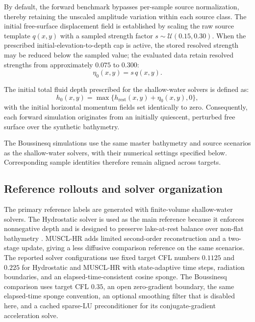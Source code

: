 By default, the forward benchmark bypasses per-sample source normalization, thereby retaining the unscaled amplitude variation within each source class. The initial free-surface displacement field is established by scaling the raw source template $q(x,y)$ with a sampled strength factor $s \sim \mathcal{U}(0.15, 0.30)$. When the prescribed initial-elevation-to-depth cap is active, the stored resolved strength may be reduced below the sampled value; the evaluated data retain resolved strengths from approximately $0.075$ to $0.300$:
\begin{equation}
\eta_0(x, y) = s\,q(x, y).
\end{equation}

The initial total fluid depth prescribed for the shallow-water solvers is defined as:
\begin{equation}
h_0(x,y) = \max\{h_{\mathrm{rest}}(x,y) + \eta_0(x,y), 0\},
\end{equation}
with the initial horizontal momentum fields set identically to zero. Consequently, each forward simulation originates from an initially quiescent, perturbed free surface over the synthetic bathymetry.

The Boussinesq simulations use the same master bathymetry and source scenarios as the shallow-water solvers, with their numerical settings specified below. Corresponding sample identities therefore remain aligned across targets.

\subsection{Reference rollouts and solver organization}
\label{subsec:reference-rollouts}

The primary reference labels are generated with finite-volume shallow-water solvers. The Hydrostatic solver is used as the main reference because it enforces nonnegative depth and is designed to preserve lake-at-rest balance over non-flat bathymetry \citep{audusse2004hydrostatic}. MUSCL-HR adds limited second-order reconstruction and a two-stage update, giving a less diffusive comparison reference on the same scenarios. The reported solver configurations use fixed target CFL numbers $0.1125$ and $0.225$ for Hydrostatic and MUSCL-HR with state-adaptive time steps, radiation boundaries, and an elapsed-time-consistent cosine sponge. The Boussinesq comparison uses target CFL $0.35$, an open zero-gradient boundary, the same elapsed-time sponge convention, an optional smoothing filter that is disabled here, and a cached sparse-LU preconditioner for its conjugate-gradient acceleration solve.

